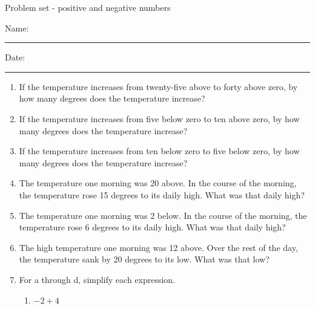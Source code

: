 \documentclass[12pt]{article}
\begin{document}
\pagestyle{empty} %
\begin{center}
          Problem set - positive and negative numbers \\[0.5in]
\end{center}
Name: \rule{4in}{0.005in} Date: \rule{1.4in}{0.005in} 
  \vspace{0.25in}

\begin{enumerate}

\item If the temperature increases from twenty-five above to forty above zero, by how many degrees does the temperature increase?  
	    \vspace{0.50in}

\item If the temperature increases from five below zero to ten above zero, by how many degrees does the temperature increase?  
	    \vspace{0.50in}

\item If the temperature increases from ten below zero to five below zero, by how many degrees does the temperature increase?  
	    \vspace{0.50in}

\item The temperature one morning was 20 above. In the course of the morning, the temperature rose 15 degrees to its daily high. What was that daily high? 
	    \vspace{0.50in}

\item The temperature one morning was 2 below. In the course of the morning, the temperature rose 6 degrees to its daily high. What was that daily high? 
	    \vspace{0.50in}

\item The high temperature one morning was 12 above. Over the rest of the day, the temperature sank by 20 degrees to its low. What was that low? 
	    \vspace{0.50in}

    \item For a through d, simplify each expression. 
\begin{multicols}{2}
\begin{enumerate}

    \item \hspace{0.250in} $-2+4$
  \vspace{0.25in}


\end{enumerate}
\end{multicols}
\end{enumerate}
\end{document}
